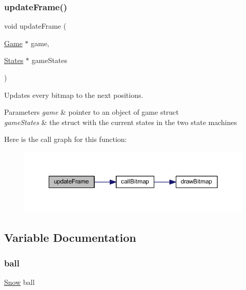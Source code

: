 \subsubsection{\texorpdfstring{update\+Frame()}{updateFrame()}}
{\footnotesize\ttfamily void update\+Frame (\begin{DoxyParamCaption}\item[{\hyperlink{struct_game}{Game} $\ast$}]{game,  }\item[{\hyperlink{struct_states}{States} $\ast$}]{game\+States }\end{DoxyParamCaption})}



Updates every bitmap to the next positions. 


\begin{DoxyParams}{Parameters}
{\em game} & pointer to an object of game struct \\
\hline
{\em game\+States} & the struct with the current states in the two state machines \\
\hline
\end{DoxyParams}
Here is the call graph for this function\+:
\nopagebreak
\begin{figure}[H]
\begin{center}
\leavevmode
\includegraphics[width=350pt]{group___graphics_gae5f0e30e1262615f852a85d4db3c8261_cgraph}
\end{center}
\end{figure}


\subsection{Variable Documentation}
\mbox{\label{group___graphics_ga5b8079ec1b1df7ef0f8f93056f52b221}} 
\subsubsection{\texorpdfstring{ball}{ball}}
{\footnotesize\ttfamily \hyperlink{struct_snow}{Snow} ball\hspace{0.3cm}{\ttfamily [static]}}




